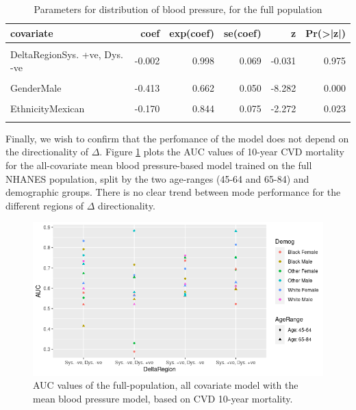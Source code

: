 \documentclass[
]{article}
\begin{document}
\begin{table}[!h]
\centering
\caption{\label{tab:DeltaDir}Parameters for distribution of blood pressure, for the full population}
\centering
\begin{tabular}[t]{lrrrrr}
\toprule
covariate & coef & exp(coef) & se(coef) & z & Pr(>|z|)\\
\midrule
\cellcolor{gray!10}{DeltaRegionSys. -ve, Dys. +ve} & \cellcolor{gray!10}{0.047} & \cellcolor{gray!10}{1.048} & \cellcolor{gray!10}{0.074} & \cellcolor{gray!10}{0.634} & \cellcolor{gray!10}{0.526}\\
DeltaRegionSys. +ve, Dys. -ve & -0.002 & 0.998 & 0.069 & -0.031 & 0.975\\
\cellcolor{gray!10}{DeltaRegionSys. +ve, Dys. +ve} & \cellcolor{gray!10}{-0.056} & \cellcolor{gray!10}{0.946} & \cellcolor{gray!10}{0.063} & \cellcolor{gray!10}{-0.881} & \cellcolor{gray!10}{0.378}\\
GenderMale & -0.413 & 0.662 & 0.050 & -8.282 & 0.000\\
\cellcolor{gray!10}{EthnicityWhite} & \cellcolor{gray!10}{-0.248} & \cellcolor{gray!10}{0.780} & \cellcolor{gray!10}{0.061} & \cellcolor{gray!10}{-4.043} & \cellcolor{gray!10}{0.000}\\
EthnicityMexican & -0.170 & 0.844 & 0.075 & -2.272 & 0.023\\
\cellcolor{gray!10}{age} & \cellcolor{gray!10}{0.100} & \cellcolor{gray!10}{1.105} & \cellcolor{gray!10}{0.002} & \cellcolor{gray!10}{50.573} & \cellcolor{gray!10}{0.000}\\
\bottomrule
\end{tabular}
\end{table}

Finally, we wish to confirm that the perfomance of the model does not depend on the directionality of \(\Delta\). Figure \ref{fig:DeltaAUCs} plots the AUC values of 10-year CVD mortality for the all-covariate mean blood pressure-based model trained on the full NHANES population, split by the two age-ranges (45-64 and 65-84) and demographic groups. There is no clear trend between mode performance for the different regions of \(\Delta\) directionality.

\begin{figure}
\centering
\includegraphics{./Rmarkdown_Plots/DeltaDirection_AUCs.png}
\caption{AUC values of the full-population, all covariate model with the mean blood pressure model, based on CVD 10-year mortality.}\label{fig:DeltaAUCs}
\end{figure}
\end{document}
